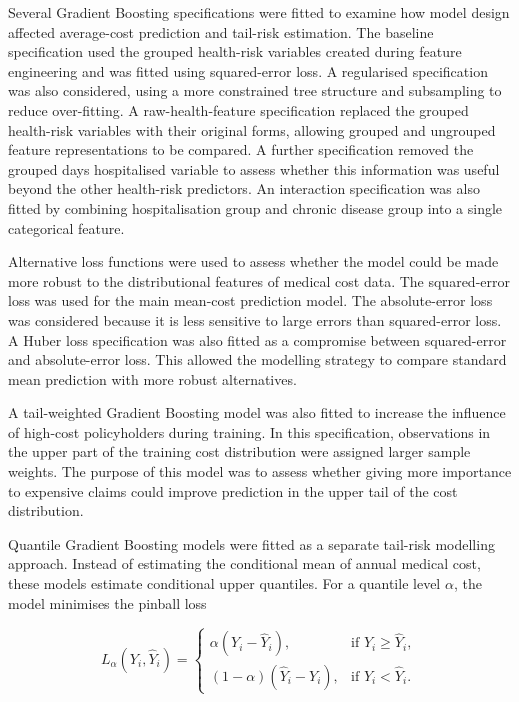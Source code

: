 \documentclass[11pt]{article}
\begin{document}
	Several Gradient Boosting specifications were fitted to examine how model design affected average-cost prediction and tail-risk estimation. The baseline specification used the grouped health-risk variables created during feature engineering and was fitted using squared-error loss. A regularised specification was also considered, using a more constrained tree structure and subsampling to reduce over-fitting. A raw-health-feature specification replaced the grouped health-risk variables with their original forms, allowing grouped and ungrouped feature representations to be compared. A further specification removed the grouped days hospitalised variable to assess whether this information was useful beyond the other health-risk predictors. An interaction specification was also fitted by combining hospitalisation group and chronic disease group into a single categorical feature.
	
	Alternative loss functions were used to assess whether the model could be made more robust to the distributional features of medical cost data. The squared-error loss was used for the main mean-cost prediction model. The absolute-error loss was considered because it is less sensitive to large errors than squared-error loss. A Huber loss specification was also fitted as a compromise between squared-error and absolute-error loss. This allowed the modelling strategy to compare standard mean prediction with more robust alternatives.
	
	A tail-weighted Gradient Boosting model was also fitted to increase the influence of high-cost policyholders during training. In this specification, observations in the upper part of the training cost distribution were assigned larger sample weights. The purpose of this model was to assess whether giving more importance to expensive claims could improve prediction in the upper tail of the cost distribution.
	
	Quantile Gradient Boosting models were fitted as a separate tail-risk modelling approach. Instead of estimating the conditional mean of annual medical cost, these models estimate conditional upper quantiles. For a quantile level \(\alpha\), the model minimises the pinball loss
	
	\begin{equation}
		L_{\alpha}(Y_i, \hat{Y}_i)
		=
		\begin{cases}
			\alpha (Y_i - \hat{Y}_i), & \text{if } Y_i \geq \hat{Y}_i, \\
			(1 - \alpha)(\hat{Y}_i - Y_i), & \text{if } Y_i < \hat{Y}_i.
		\end{cases}
	\end{equation}
	
\end{document}
